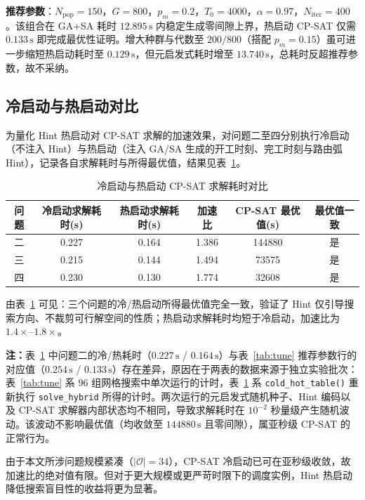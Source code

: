 \documentclass[12pt,a4paper]{ctexart}
\begin{document}
\textbf{推荐参数}：$N_{\mathrm{pop}}=150$，$G=800$，$p_m=0.2$，$T_0=4000$，$\alpha=0.97$，$N_{\mathrm{iter}}=400$。该组合在 GA+SA 耗时 $12.895\,\mathrm{s}$ 内稳定生成零间隙上界，热启动 CP-SAT 仅需 $0.133\,\mathrm{s}$ 即完成最优性证明。增大种群与代数至 $200/800$（搭配 $p_m=0.15$）虽可进一步缩短热启动耗时至 $0.129\,\mathrm{s}$，但元启发式耗时增至 $13.740\,\mathrm{s}$，总耗时反超推荐参数，故不采纳。

\subsection{冷启动与热启动对比}

为量化 Hint 热启动对 CP-SAT 求解的加速效果，对问题二至四分别执行冷启动（不注入 Hint）与热启动（注入 GA/SA 生成的开工时刻、完工时刻与路由弧 Hint），记录各自求解耗时与所得最优值，结果见表~\ref{tab:coldhot}。

\begin{table}[H]
\centering
\caption{冷启动与热启动 CP-SAT 求解耗时对比}\label{tab:coldhot}
\begin{tabular}{c c c c c c}
\toprule
问题 & 冷启动求解耗时(s) & 热启动求解耗时(s) & 加速比 & CP-SAT 最优值(s) & 最优值一致 \\
\midrule
二 & 0.227 & 0.164 & 1.386 & 144880 & 是 \\
三 & 0.215 & 0.144 & 1.494 & 73575 & 是 \\
四 & 0.230 & 0.130 & 1.774 & 32608 & 是 \\
\bottomrule
\end{tabular}
\end{table}

由表~\ref{tab:coldhot} 可见：三个问题的冷/热启动所得最优值完全一致，验证了 Hint 仅引导搜索方向、不裁剪可行解空间的性质；热启动求解耗时均短于冷启动，加速比为 $1.4\times$--$1.8\times$。

\medskip
\noindent\textbf{注：}表~\ref{tab:coldhot} 中问题二的冷/热耗时（$0.227\,\mathrm{s}$ / $0.164\,\mathrm{s}$）与表~\ref{tab:tune} 推荐参数行的对应值（$0.254\,\mathrm{s}$ / $0.133\,\mathrm{s}$）存在差异，原因在于两表的数据来源于独立实验批次：表~\ref{tab:tune} 系 96 组网格搜索中单次运行的计时，表~\ref{tab:coldhot} 系 \texttt{cold\_hot\_table()} 重新执行 \texttt{solve\_hybrid} 所得的计时。两次运行的元启发式随机种子、Hint 编码以及 CP-SAT 求解器内部状态均不相同，导致求解耗时在 $10^{-2}$ 秒量级产生随机波动。该波动不影响最优值（均收敛至 $144880\,\mathrm{s}$ 且零间隙），属亚秒级 CP-SAT 的正常行为。

由于本文所涉问题规模紧凑（$|\mathcal{O}|=34$），CP-SAT 冷启动已可在亚秒级收敛，故加速比的绝对值有限。但对于更大规模或更严苛时限下的调度实例，Hint 热启动降低搜索盲目性的收益将更为显著。
\end{document}
